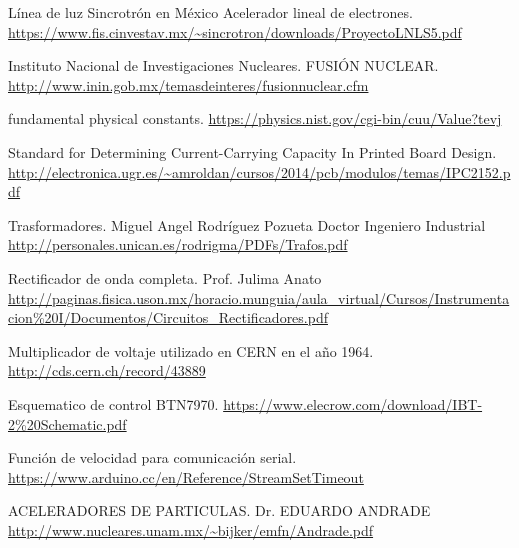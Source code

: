 \documentclass[twoside,22pt]{Latex/Classes/thesisUMSNH}
\begin{document}


\begin{thebibliography}{2}
   Línea de luz Sincrotrón en México
Acelerador lineal de electrones. \url{https://www.fis.cinvestav.mx/~sincrotron/downloads/ProyectoLNLS5.pdf}

Instituto Nacional de Investigaciones Nucleares. FUSIÓN NUCLEAR. \url{http://www.inin.gob.mx/temasdeinteres/fusionnuclear.cfm}

fundamental physical constants. \url{https://physics.nist.gov/cgi-bin/cuu/Value?tevj}


Standard for Determining Current-Carrying Capacity In Printed Board Design. \url{http://electronica.ugr.es/~amroldan/cursos/2014/pcb/modulos/temas/IPC2152.pdf}

Trasformadores. Miguel Angel Rodríguez Pozueta
Doctor Ingeniero Industrial \url{http://personales.unican.es/rodrigma/PDFs/Trafos.pdf}

Rectificador de onda completa. Prof. Julima Anato \url{http://paginas.fisica.uson.mx/horacio.munguia/aula_virtual/Cursos/Instrumentacion\%20I/Documentos/Circuitos_Rectificadores.pdf}

Multiplicador de voltaje utilizado en CERN en el año 1964. \url{http://cds.cern.ch/record/43889}

Esquematico de control BTN7970. \url{https://www.elecrow.com/download/IBT-2\%20Schematic.pdf}

Función de velocidad para comunicación serial. \url{https://www.arduino.cc/en/Reference/StreamSetTimeout}

ACELERADORES DE PARTICULAS. Dr. EDUARDO ANDRADE \url{http://www.nucleares.unam.mx/\~bijker/emfn/Andrade.pdf}


\end{thebibliography}
\end{document}

